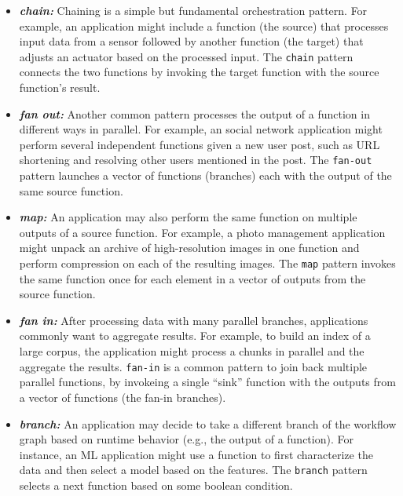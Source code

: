 \begin{itemize}
    \item \textit{\textbf{chain:} }
    Chaining is a simple but fundamental orchestration pattern. For example,
    an application might include a function (the source) that processes input
    data from a sensor followed by another function (the target) that adjusts
    an actuator based on the processed input. The \texttt{chain} pattern
    connects the two functions by invoking the target function with the source
    function's result.

    \item \textit{\textbf{fan out:}} 
    Another common pattern processes the output of a function in different
    ways in parallel. For example, an social network application might perform
    several independent functions given a new user post, such as URL
    shortening and resolving other users mentioned in the post. The
    \texttt{fan-out} pattern launches a vector of functions (branches) each
    with the output of the same source function.

	\item \textit{\textbf{map: }}
    An application may also perform the same function on multiple outputs of a
    source function. For example, a photo management application might unpack an
    archive of high-resolution images in one function and perform compression on
    each of the resulting images. The \texttt{map} pattern invokes the same
    function once for each element in a vector of outputs from the source
    function.

	\item \textit{\textbf{fan in:}}
    After processing data with many parallel branches, applications commonly
    want to aggregate results. For example, to build an index of a large
    corpus, the application might process a chunks in parallel and the
    aggregate the results. \texttt{fan-in} is a common pattern to join back
    multiple parallel functions, by invokeing a single ``sink'' function with
    the outputs from a vector of functions (the fan-in branches).

    \item \textit{\textbf{branch:}}
    An application may decide to take a different branch of the workflow graph
    based on runtime behavior (e.g., the output of a function). For instance,
    an ML application might use a function to first characterize the data and
    then select a model based on the features. The \texttt{branch} pattern
    selects a next function based on some boolean condition.


\end{itemize}
